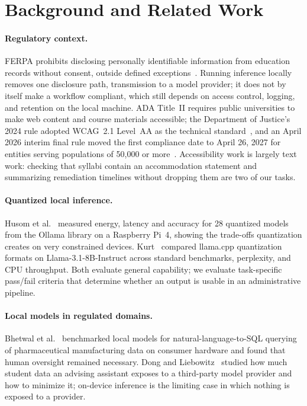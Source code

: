 \documentclass[sigconf,nonacm]{acmart}
\begin{document}
\section{Background and Related Work}

\paragraph{Regulatory context.}
FERPA prohibits disclosing personally identifiable information from education records without consent, outside defined exceptions~\cite{ferpa}.
Running inference locally removes one disclosure path, transmission to a model provider; it does not by itself make a workflow compliant, which still depends on access control, logging, and retention on the local machine.
ADA Title~II requires public universities to make web content and course materials accessible; the Department of Justice's 2024 rule adopted WCAG~2.1 Level~AA as the technical standard~\cite{doj2024titleii,wcag21}, and an April 2026 interim final rule moved the first compliance date to April 26, 2027 for entities serving populations of 50,000 or more~\cite{doj2026ifr}.
Accessibility work is largely text work: checking that syllabi contain an accommodation statement and summarizing remediation timelines without dropping them are two of our tasks.

\paragraph{Quantized local inference.}
Husom et al.~\cite{husom2025sustainable} measured energy, latency and accuracy for 28 quantized models from the Ollama library on a Raspberry Pi~4, showing the trade-offs quantization creates on very constrained devices.
Kurt~\cite{kurt2026quantization} compared llama.cpp quantization formats on Llama-3.1-8B-Instruct across standard benchmarks, perplexity, and CPU throughput.
Both evaluate general capability; we evaluate task-specific pass/fail criteria that determine whether an output is usable in an administrative pipeline.

\paragraph{Local models in regulated domains.}
Bhetwal et al.~\cite{bhetwal2026nlsql} benchmarked local models for natural-language-to-SQL querying of pharmaceutical manufacturing data on consumer hardware and found that human oversight remained necessary.
Dong and Liebowitz~\cite{dong2025minimizing} studied how much student data an advising assistant exposes to a third-party model provider and how to minimize it; on-device inference is the limiting case in which nothing is exposed to a provider.
\end{document}

